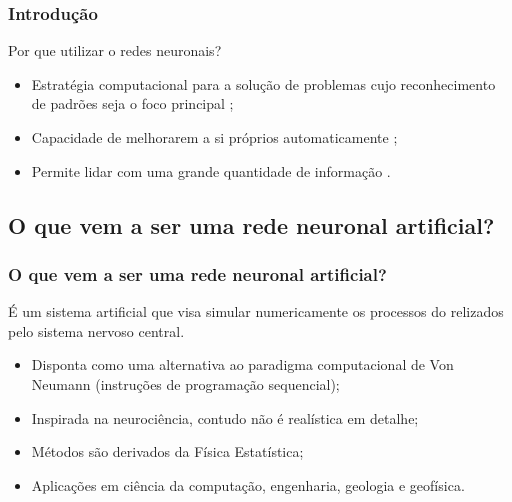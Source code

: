 \documentclass[10pt]{beamer} %
\begin{document}
\begin{frame}
	\frametitle{Introdução}
	\transboxin%
	\begin{block}{Por que utilizar o redes neuronais?}
		\begin{itemize}
			\pause
			\item Estratégia computacional para a solução de problemas cujo reconhecimento de padrões seja o foco principal \citep{MacKay2005};
			\pause
			\item Capacidade de melhorarem a si próprios automaticamente \citep{Michie1994,Levy1997};
			\pause
			\item Permite lidar com uma grande quantidade de informação \citep{Mao1996,Hall2014}.
		\end{itemize}	
	\end{block}
	
\end{frame}
\subsection{O que vem a ser uma rede neuronal artificial?}
\begin{frame}
	\frametitle{O que vem a ser uma rede neuronal artificial?}
				\pause
				\color{blue} É um sistema artificial que visa simular numericamente os processos do relizados pelo sistema nervoso central. 
				\pause
				\begin{itemize}
					\item Disponta como uma alternativa ao paradigma computacional de Von Neumann (instruções de programação sequencial);
					\pause
					\item Inspirada na neurociência, contudo não é realística em detalhe;
					\pause
					\item Métodos são derivados da Física Estatística;
					\pause
					\item Aplicações em ciência da computação, engenharia, geologia e geofísica. 
				\end{itemize}
\end{frame}
\end{document}
